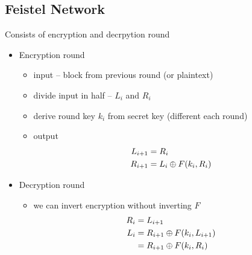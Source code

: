 \documentclass[draft]{article}
\begin{document}
\begin{multicols}{2}
{}
\end{multicols}
\subsection{Feistel Network}
Consists of encryption and decrpytion round
\begin{multicols}{2}
    \begin{itemize}[nosep]
        \item Encryption round
              \begin{itemize}[nosep]
                  \item input -- block from previous round (or plaintext)
                  \item divide input in half -- $L_i$ and $R_i$
                  \item derive round key $k_i$ from secret key (different each round)
                  \item output
                        \begin{align*}
                            L_{i+1} & = R_i                  \\
                            R_{i+1} & = L_i \oplus F(k_i, R_i)
                        \end{align*}
              \end{itemize}
        \item Decryption round
              \begin{itemize}[nosep]
                  \item we can invert encryption without inverting $F$
                        \begin{align*}
                            R_i & = L_{i + 1}                        \\
                            L_i & = R_{i + 1} \oplus F(k_i, L_{i + 1}) \\
                                & = R_{i + 1} \oplus F(k_i, R_i)
                        \end{align*}
              \end{itemize}
    \end{itemize}
\end{multicols}
\end{document}
